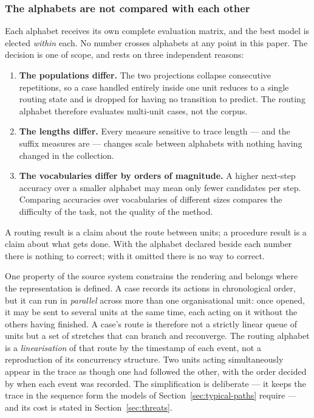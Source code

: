 \subsubsection*{The alphabets are not compared with each other}

Each alphabet receives its own complete evaluation matrix, and the best model is elected
\emph{within} each. No number crosses alphabets at any point in this paper. The decision is one
of scope, and rests on three independent reasons:

\begin{enumerate}
  \item \textbf{The populations differ.} The two projections collapse consecutive repetitions, so
    a case handled entirely inside one unit reduces to a single routing state and is dropped for
    having no transition to predict. The routing alphabet therefore evaluates multi-unit cases,
    not the corpus.
  \item \textbf{The lengths differ.} Every measure sensitive to trace length --- and the suffix
    measures are --- changes scale between alphabets with nothing having changed in the
    collection.
  \item \textbf{The vocabularies differ by orders of magnitude.} A higher next-step accuracy over
    a smaller alphabet may mean only fewer candidates per step. Comparing accuracies over
    vocabularies of different sizes compares the difficulty of the task, not the quality of the
    method.
\end{enumerate}

A routing result is a claim about the route between units; a procedure result is a claim about
what gets done. With the alphabet declared beside each number there is nothing to correct; with
it omitted there is no way to correct.

One property of the source system constrains the rendering and belongs where the representation
is defined. A case records its actions in chronological order, but it can run in \emph{parallel}
across more than one organisational unit: once opened, it may be sent to several units at the
same time, each acting on it without the others having finished. A case's route is therefore not
a strictly linear queue of units but a set of stretches that can branch and reconverge. The
routing alphabet is a \emph{linearisation} of that route by the timestamp of each event, not a
reproduction of its concurrency structure. Two units acting simultaneously appear in the trace as
though one had followed the other, with the order decided by when each event was recorded. The
simplification is deliberate --- it keeps the trace in the sequence form the models of
Section~\ref{sec:typical-paths} require --- and its cost is stated in Section~\ref{sec:threats}.

